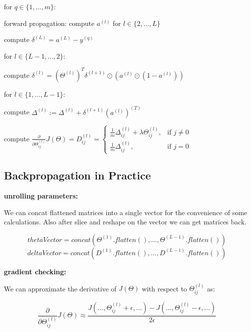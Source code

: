 \documentclass{article}
\begin{document}
\noindent for \(q \in \{1, \dots, m\}\):

\noindent \hspace{.5cm} forward propagation: compute \(a^{(l)}\) for \(l \in \{2, \dots, L\}\)

\noindent \hspace{.5cm} compute \(\delta^{(L)} = a^{(L)} - y^{(q)}\)

\noindent \hspace{.5cm} for \(l \in \{L - 1, \dots, 2\}\):

\noindent \hspace{1cm} compute \(\delta^{(l)} = (\Theta^{(l)})^T \delta^{(l + 1)} \odot (a^{(l)} \odot (1 - a^{(l)}))\)

\noindent \hspace{.5cm} for \(l \in \{1, \dots, L - 1\}\):

\noindent \hspace{1cm} compute \(\Delta^{(l)} := \Delta^{(l)} + \delta^{(l + 1)}(a^{(l)})^{(T)}\)

\noindent compute \(\frac{\partial}{\partial \Theta_{ij}^{(l)}} J(\Theta) = D_{ij}^{(l)} = 
\begin{cases}
  \frac{1}{m} \Delta_{ij}^{(l)} + \lambda \Theta_{ij}^{(l)}, & \text{if } j \neq 0 \\
  \frac{1}{m} \Delta_{ij}^{(l)}, & \text{if } j = 0
\end{cases}
\)

\subsection{Backpropagation in Practice}

\noindent \textbf{unrolling parameters:}

\noindent We can concat flattened matrices into a single vector for the convenience of some calculations. Also after slice and reshape on the vector we can get matrices back.

\[thetaVector = concat(\Theta^{(1)}.flatten(), \dots, \Theta^{(L - 1)}.flatten())\]
\[deltaVector = concat(D^{(1)}.flatten(), \dots, D^{(L - 1)}.flatten())\]

\noindent \textbf{gradient checking:}

\noindent We can approximate the derivative of \(J(\Theta)\) with respect to \(\Theta_{ij}^{(l)}\) as:

\[\frac{\partial}{\partial \Theta_{ij}^{(l)}} J(\Theta) \approx \frac{J(\dots, \Theta_{ij}^{(l)} + \epsilon, \dots) - J(\dots, \Theta_{ij}^{(l)} - \epsilon, \dots)}{2\epsilon}\]
\end{document}
